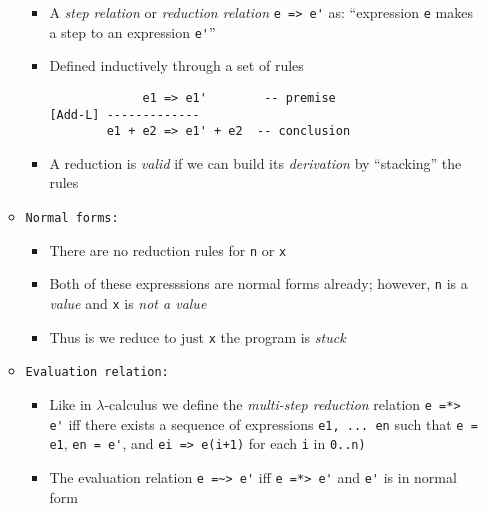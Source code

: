 \documentclass[landscape,8pt]{extarticle}
\newcommand{\code}{\lstinline}
\begin{document}
\begin{multicols}{3}
\begin{itemize}
\begin{itemize}
\begin{itemize}
                      \item A \emph{step relation} or \emph{reduction relation} \code{e => e'} as: ``expression \code{e} makes a step to an expression \code{e'}''
                      \item Defined inductively through a set of rules
\begin{lstlisting}
             e1 => e1'        -- premise
[Add-L] -------------
        e1 + e2 => e1' + e2  -- conclusion
\end{lstlisting}
\item A reduction is \emph{valid} if we can build its \emph{derivation} by ``stacking'' the rules
                  \end{itemize}
                  \item \code{Normal forms:}
                  \begin{itemize}
                      \item There are no reduction rules for \code{n} or \code{x}
                      \item Both of these expresssions are normal forms already; however, \code{n} is a \emph{value} and \code{x} is \emph{not a value}
                      \item Thus is we reduce to just \code{x} the program is \emph{stuck}
                  \end{itemize}
                  \item \code{Evaluation relation:}
                  \begin{itemize}
                      \item Like in $\lambda$-calculus we define the \emph{multi-step reduction} relation \code{e =*> e'} iff there exists a sequence of expressions \code{e1, ... en} such that \code{e = e1}, \code{en = e'}, and \code{ei => e(i+1)} for each \code{i} in \code{0..n)}
                      \item The evaluation relation \code{e =~> e'} iff \code{e =*> e'} and \code{e'} is in normal form
                  \end{itemize}
              \end{itemize}
    \end{itemize}
\end{multicols}
\end{document}
